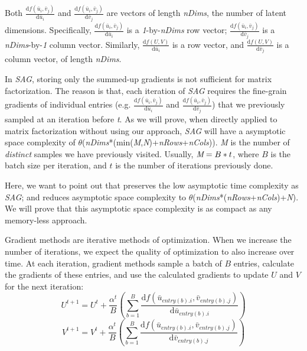 Both $\frac{\text{d}f(\bar{u}_i,\bar{v}_j)}{\text{d}\bar{u}_i}$ and $\frac{\text{d}f(\bar{u}_i,\bar{v}_j)}{\text{d}\bar{v}_j}$ are vectors of length \emph{nDims}, the number of latent dimensions.
Specifically, $\frac{\text{d}f(\bar{u}_i,\bar{v}_j)}{\text{d}\bar{u}_i}$ is a \emph{1}-by-\emph{nDims} row vector;
$\frac{\text{d}f(\bar{u}_i,\bar{v}_j)}{\text{d}\bar{v}_j}$ is a \emph{nDims}-by-\emph{1} column vector.
Similarly, $\frac{\text{d}f(U,V)}{\text{d}\bar{u}_i}$ is a row vector, and $\frac{\text{d}f(U,V)}{\text{d}\bar{v}_j}$ is a column vector, of length \emph{nDims}.

In \emph{SAG}, storing only the summed-up gradients is not sufficient for matrix factorization.
The reason is that, each iteration of \emph{SAG} requires the fine-grain gradients of individual entries 
(e.g. $\frac{\text{d}f(\bar{u}_i,\bar{v}_j)}{\text{d}\bar{u}_i}$ and $\frac{\text{d}f(\bar{u}_i,\bar{v}_j)}{\text{d}\bar{v}_j}$) 
that we previously sampled at an iteration before \emph{t}.  
As we will prove, when directly applied to matrix factorization without using our \tool approach, \emph{SAG} will have a asymptotic space complexity of $\theta$(\emph{nDims}*(min(\emph{M},\emph{N})+\emph{nRows}+\emph{nCols})).
\emph{M} is the number of \emph{distinct} samples we have previously visited.  
Usually, $\emph{M} = B*t$, where $B$ is the batch size per iteration, and $t$ is the number of iterations previously done.  

Here, we want to point out that \tool preserves the low asymptotic time complexity as \emph{SAG}; and \tool reduces asymptotic space complexity to $\theta$(\emph{nDims}*(\emph{nRows}+\emph{nCols})+\emph{N}). 
We will prove that this asymptotic space complexity is as compact as any memory-less approach.


Gradient methods are iterative methods of optimization.  
When we increase the number of iterations, we expect the quality of optimization to also increase over time.
At each iteration, gradient methods sample a batch of $B$ entries, calculate the gradients of these entries, and use the calculated gradients to update $U$ and $V$ for the next iteration:
\begin{equation} \label{eq:Ut}
U^{t+1} = U^t + \frac{\alpha^{t}}{B}\left(\sum_{b=1}^{B}\frac{\text{d}f(\bar{u}_{entry(b).i}, \bar{v}_{entry(b).j})}{\text{d}\bar{u}_{entry(b).i}}\right)
\end{equation}
\begin{equation} \label{eq:Vt}
V^{t+1} = V^t + \frac{\alpha^{t}}{B}\left(\sum_{b=1}^{B}\frac{\text{d}f(\bar{u}_{entry(b).i}, \bar{v}_{entry(b).j})}{\text{d}\bar{v}_{entry(b).j}}\right)
\end{equation}

